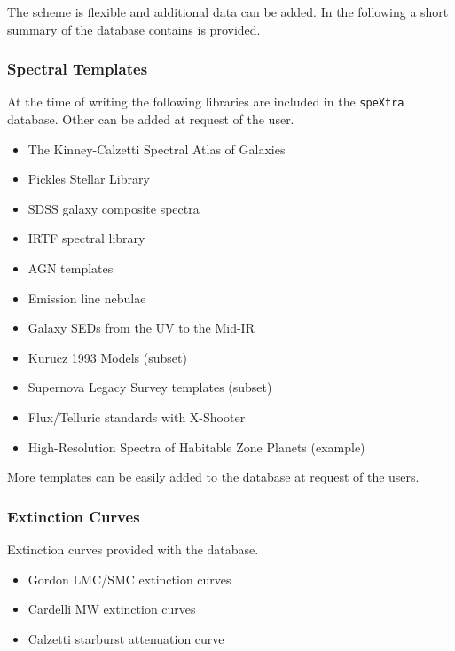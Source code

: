 The scheme is flexible and additional data can be added.
In the following a short summary of the database contains is provided.


\subsubsection{Spectral Templates%
  \label{spectral-templates}%
}

At the time of writing the following libraries are included in the \texttt{speXtra} database.
Other can be added at request of the user.

\begin{itemize}
\item The Kinney-Calzetti Spectral Atlas of Galaxies

\item Pickles Stellar Library

\item SDSS galaxy composite spectra

\item IRTF spectral library

\item AGN templates

\item Emission line nebulae

\item Galaxy SEDs from the UV to the Mid-IR

\item Kurucz 1993 Models (subset)

\item Supernova Legacy Survey templates (subset)

\item Flux/Telluric standards with X-Shooter

\item High-Resolution Spectra of Habitable Zone Planets (example)
\end{itemize}

More templates can be easily added to the database at request of the users.


\subsubsection{Extinction Curves%
  \label{extinction-curves}%
}

Extinction curves provided with the database.

\begin{itemize}
\item Gordon LMC/SMC extinction curves

\item Cardelli MW extinction curves

\item Calzetti starburst attenuation curve
\end{itemize}

